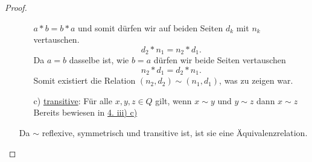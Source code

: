 \documentclass{exam}
\begin{document}
\begin{proof}
\begin{enumerate}
\begin{enumerate}
                           $a*b = b*a$ und somit dürfen wir auf beiden Seiten
                           $d_k$ mit $n_k$ vertauschen.
                        \[
                            d_2*n_1=n_2*d_1.
                        \]
                        Da $a = b$ dasselbe ist, wie $b = a$ dürfen wir beide
                        Seiten vertauschen \[
                            n_2*d_1 = d_2*n_1.
                        \]
                        Somit existiert die Relation $(n_2,d_2) \sim (n_1,
                        d_1)$, was zu zeigen war.
                  \item [c)] \underline{transitive}: Für alle $x,y,z \in Q$ gilt, wenn $x \sim y$ und $y \sim z$ dann $x \sim z$ \newline
                        Bereits bewiesen in \underline{4. iii) c)}
              \end{enumerate}
              Da $\sim$ reflexive, symmetrisch und transitive ist, ist sie eine Äquivalenzrelation.
    \end{enumerate}
\end{proof}
\end{document}
